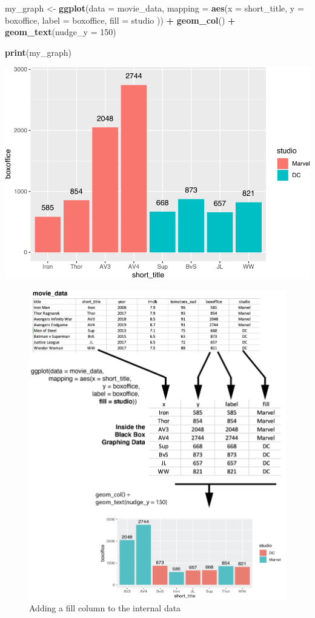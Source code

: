 \documentclass[
]{krantz}
\makeatletter
\newenvironment{Shaded}{\begin{snugshade}}{\end{snugshade}}
\newcommand{\DataTypeTok}[1]{\textcolor[rgb]{0.27,0.27,0.27}{#1}}
\newcommand{\DecValTok}[1]{\textcolor[rgb]{0.06,0.06,0.06}{#1}}
\newcommand{\KeywordTok}[1]{\textcolor[rgb]{0.27,0.27,0.27}{\textbf{#1}}}
\newcommand{\NormalTok}[1]{#1}
\newcommand{\OperatorTok}[1]{\textcolor[rgb]{0.43,0.43,0.43}{\textbf{#1}}}
\newcommand{\StringTok}[1]{\textcolor[rgb]{0.5,0.5,0.5}{#1}}
\newenvironment{kframe}{%
\medskip{}
\setlength{\fboxsep}{.8em}
 \def\at@end@of@kframe{}%
 \ifinner\ifhmode%
  \def\at@end@of@kframe{\end{minipage}}%
  \begin{minipage}{\columnwidth}%
 \fi\fi%
 \def\FrameCommand##1{\hskip\@totalleftmargin \hskip-\fboxsep
 \colorbox{shadecolor}{##1}\hskip-\fboxsep
     \hskip-\linewidth \hskip-\@totalleftmargin \hskip\columnwidth}%
 \MakeFramed {\advance\hsize-\width
   \@totalleftmargin\z@ \linewidth\hsize
   \@setminipage}}%
 {\par\unskip\endMakeFramed%
 \at@end@of@kframe}
\renewenvironment{Shaded}{\begin{kframe}}{\end{kframe}}
\makeatother
\begin{document}
\begin{Shaded}
\begin{Highlighting}[]
\NormalTok{my_graph <-}\StringTok{ }\KeywordTok{ggplot}\NormalTok{(}\DataTypeTok{data =}\NormalTok{ movie_data,}
           \DataTypeTok{mapping =} \KeywordTok{aes}\NormalTok{(}\DataTypeTok{x =}\NormalTok{ short_title,}
                         \DataTypeTok{y =}\NormalTok{ boxoffice,}
                         \DataTypeTok{label =}\NormalTok{ boxoffice,}
                         \DataTypeTok{fill =}\NormalTok{ studio )) }\OperatorTok{+}
\StringTok{  }\KeywordTok{geom_col}\NormalTok{() }\OperatorTok{+}
\StringTok{  }\KeywordTok{geom_text}\NormalTok{(}\DataTypeTok{nudge_y =} \DecValTok{150}\NormalTok{) }

\KeywordTok{print}\NormalTok{(my_graph)}
\end{Highlighting}
\end{Shaded}

\includegraphics[width=0.65\linewidth]{bookdown_files/figure-latex/unnamed-chunk-265-1}

\begin{figure}
\includegraphics[width=0.7\linewidth]{ch_graphing/images/mapping_fill} \caption{Adding a fill column to the internal data}\label{fig:addfill}
\end{figure}
\end{document}

